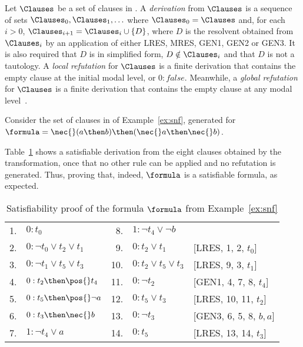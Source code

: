 \begin{definition}
    Let $\Clauses$ be a set of clauses in . A \emph{derivation} from
    $\Clauses$ is a sequence of sets $\Clauses_0, \Clauses_1, \ldots$ where
    $\Clauses_0 = \Clauses$ and, for each $i > 0$, $\Clauses_{i+1} = \Clauses_i
    \cup \{D\}$, where $D$ is the resolvent obtained from $\Clauses_i$ by an
    application of either LRES, MRES, GEN1, GEN2 or GEN3. It is also required
    that $D$ is in simplified form, $D \notin \Clauses_i$ and that $D$ is not a
    tautology. A \emph{local refutation} for $\Clauses$ is a finite derivation
    that contains the empty clause at the initial modal level, or $0:
    false$. Meanwhile, a \emph{global refutation} for
    $\Clauses$ is a finite derivation that contains the empty clause at any
    modal level~\cite{nalon2015modal}.
\end{definition}



\begin{example}%
    \label{ex:calcsat}
    Consider the set of clauses in  of Example~\ref{ex:snf}, generated
    for $\formula = \nec{}(a \then b) \then (\nec{} a \then \nec{}b)$.

    Table~\ref{tab:calcsat} shows a satisfiable derivation from the eight
    clauses obtained by the transformation, once that no other rule can be
    applied and no refutation is generated. Thus, proving that, indeed,
    $\formula$ is a satisfiable formula, as expected.

    \begin{table}[h!]%
        \caption{Satisfiability proof of the formula $\formula$ from Example~\ref{ex:snf}}
        \centering%
        \begin{tabular}{rlrll}
            1. & $0 : t_0$                        & 8. & $1 : \neg t_4 \lor \neg b$   & \\
            2. & $0 : \neg t_0 \lor t_2 \lor t_1$ & 9.  & $0 : t_2 \lor t_1$          & [LRES, 1, 2, $t_0$]\\ 
            3. & $0 : \neg t_1 \lor t_5 \lor t_3$ & 10. & $0 : t_2 \lor t_5 \lor t_3$ & [LRES, 9, 3, $t_1$]\\ 
            4. & $0 : t_2 \then \pos {}t_4$       & 11. & $0 : \neg t_2$              & [GEN1, 4, 7, 8, $t_4$]\\
            5. & $0 : t_5 \then \pos{} \neg a$    & 12. & $0 : t_5 \lor t_3$          & [LRES, 10, 11, $t_2$]\\ 
            6. & $0 : t_3 \then \nec{} b$         & 13. & $0 : \neg t_3$              & [GEN3, 6, 5, 8, $b, a$]\\
            7. & $1 : \neg t_4 \lor a$            & 14. & $0 : t_5$                   & [LRES, 13, 14, $t_3$] \\
       \end{tabular}%
        \label{tab:calcsat}
    \end{table}
\end{example}

